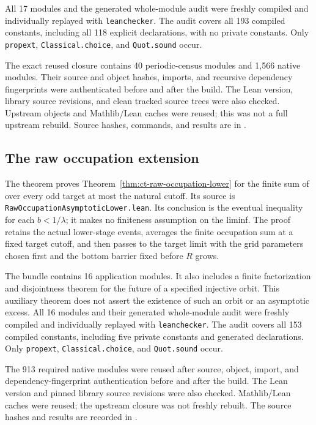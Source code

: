 \documentclass[11pt,a4paper]{article}
\begin{document}
All 17 modules and the generated whole-module audit were freshly
compiled and individually replayed with \texttt{leanchecker}.
The audit covers all 193 compiled constants, including all 118 explicit
declarations, with no private constants. Only \texttt{propext},
\texttt{Classical.choice}, and \texttt{Quot.sound} occur.

The exact reused closure contains 40 periodic-census modules and
1,566 native modules. Their source and object hashes, imports, and
recursive dependency fingerprints were authenticated before and
after the build. The Lean version, library source revisions, and
clean tracked source trees were also checked. Upstream objects and
Mathlib/Lean caches were reused; this
was not a full upstream rebuild. Source hashes, commands, and results
are in .

\subsection{The raw occupation extension}

The theorem  proves
Theorem~\ref{thm:ct-raw-occupation-lower} for the finite sum of
 over every odd target at most the natural
cutoff. Its source is \texttt{RawOccupationAsymptoticLower.lean}.
Its conclusion is the eventual inequality for each
\(b<1/\lambda\); it makes no finiteness assumption on the liminf.
The proof retains the actual lower-stage events, averages the finite
occupation sum at a fixed target cutoff, and then passes to the target
limit with the grid parameters chosen first and the bottom barrier
fixed before \(R\) grows.

The bundle  contains 16 application modules.
It also includes a finite factorization and disjointness theorem for
the future of a specified injective orbit. This auxiliary theorem does
not assert the existence of such an orbit or an asymptotic excess.
All 16 modules and their generated whole-module audit were freshly
compiled and individually replayed with \texttt{leanchecker}.
The audit covers all 153 compiled constants, including five private
constants and generated declarations. Only \texttt{propext},
\texttt{Classical.choice}, and \texttt{Quot.sound} occur.

The 913 required native modules were reused after source, object,
import, and dependency-fingerprint authentication before and after
the build. The Lean version and pinned library source revisions were
also checked. Mathlib/Lean caches were reused; the upstream closure
was not freshly rebuilt. The source hashes and results are recorded
in .
\end{document}
